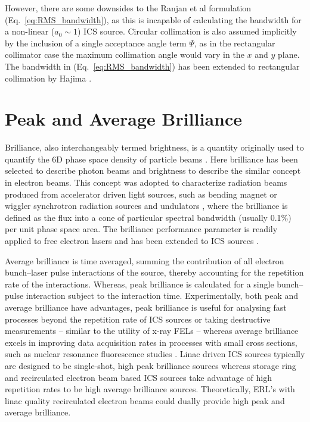 \documentclass[../main.tex]{subfiles}
\begin{document}
However, there are some downsides to the Ranjan et al formulation (Eq.~\ref{eq:RMS_bandwidth}), as this is incapable of calculating the bandwidth for a non-linear ($a_{0}\sim 1$) ICS source. Circular collimation is also assumed implicitly by the inclusion of a single acceptance angle term $\Psi$, as in the rectangular collimator case the maximum collimation angle would vary in the $x$ and $y$ plane. The bandwidth in (Eq.~\ref{eq:RMS_bandwidth}) has been extended to rectangular collimation by Hajima \cite{hajima2021bandwidth}. 

\section{Peak and Average Brilliance}
\label{sec:peak_average_brilliance}

Brilliance, also interchangeably termed brightness, is a quantity originally used to quantify the 6D phase space density of particle beams \cite{courant1958theory}. Here brilliance has been selected to describe photon beams and brightness to describe the similar concept in electron beams. This concept was adopted to characterize radiation beams produced from accelerator driven light sources, such as bending magnet or wiggler synchrotron radiation sources and undulators \cite{kim1989characteristics}, where the brilliance is defined as the flux into a cone of particular spectral bandwidth (usually 0.1\%) per unit phase space area. The brilliance performance parameter is readily applied to free electron lasers \cite{krinsky1983undulators,kim1987brightness} and has been extended to ICS sources \cite{hartemann2005high,krafft2010compton}.  

Average brilliance is time averaged, summing the contribution of all electron bunch--laser pulse interactions of the source, thereby accounting for the repetition rate of the interactions. Whereas, peak brilliance is calculated for a single bunch--pulse interaction subject to the interaction time. Experimentally, both peak and average brilliance have advantages, peak brilliance is useful for analysing fast processes beyond the repetition rate of ICS sources or taking destructive measurements -- similar to the utility of x-ray FELs -- whereas average brilliance excels in improving data acquisition rates in processes with small cross sections, such as nuclear resonance fluorescence studies \cite{angell2015demonstration}. Linac driven ICS sources typically are designed to be single-shot, high peak brilliance sources whereas storage ring and recirculated electron beam based ICS sources take advantage of high repetition rates to be high average brilliance sources. Theoretically, ERL's with linac quality recirculated electron beams could dually provide high peak and average brilliance.   
\end{document}
